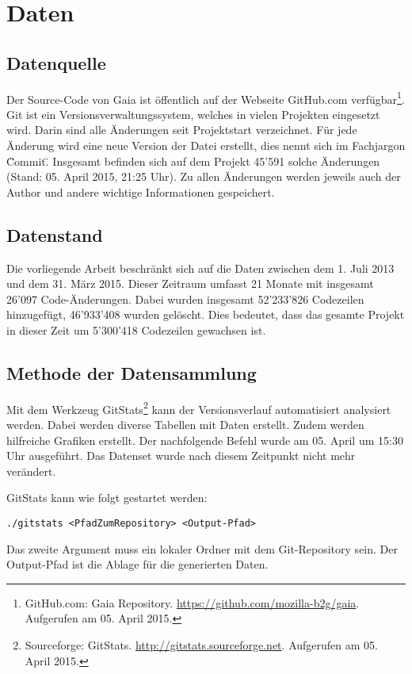 \chapter{Daten}

\section{Datenquelle}
Der Source-Code von Gaia ist öffentlich auf der Webseite GitHub.com verfügbar\footnote{GitHub.com: Gaia Repository. \url{https://github.com/mozilla-b2g/gaia}. Aufgerufen am 05. April 2015.}. Git ist ein Versionsverwaltungssystem, welches in vielen Projekten eingesetzt wird. Darin sind alle Änderungen seit Projektstart verzeichnet. Für jede Änderung wird eine neue Version der Datei erstellt, dies nennt sich im Fachjargon \"Commit\". Insgesamt befinden sich auf dem Projekt 45'591 solche Änderungen (Stand: 05. April 2015, 21:25 Uhr). Zu allen Änderungen werden jeweils auch der Author und andere wichtige Informationen gespeichert.

\section{Datenstand}
Die vorliegende Arbeit beschränkt sich auf die Daten zwischen dem 1. Juli 2013 und dem 31. März 2015. Dieser Zeitraum umfasst 21 Monate mit insgesamt 26'097 Code-Änderungen. Dabei wurden insgesamt 52'233'826 Codezeilen hinzugefügt, 46'933'408 wurden gelöscht. Dies bedeutet, dass das gesamte Projekt in dieser Zeit um 5'300'418 Codezeilen gewachsen ist.

\section{Methode der Datensammlung}
Mit dem Werkzeug GitStats\footnote{Sourceforge: GitStats. \url{http://gitstats.sourceforge.net}. Aufgerufen am 05. April 2015.} kann der Versionsverlauf automatisiert analysiert werden. Dabei werden diverse Tabellen mit Daten erstellt. Zudem werden hilfreiche Grafiken erstellt. Der nachfolgende Befehl wurde am 05. April um 15:30 Uhr ausgeführt. Das Datenset wurde nach diesem Zeitpunkt nicht mehr verändert.

\noindent
GitStats kann wie folgt gestartet werden:

\begin{lstlisting}
./gitstats <PfadZumRepository> <Output-Pfad>
\end{lstlisting}

\noindent
Das zweite Argument muss ein lokaler Ordner mit dem Git-Repository sein. Der Output-Pfad ist die Ablage für die generierten Daten.

